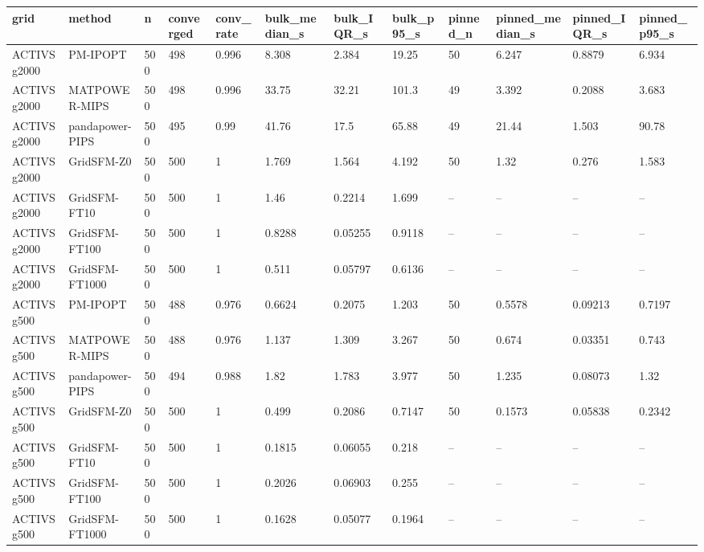 \begin{tabular}{llllllllllll}
\hline
grid & method & n & converged & conv\_rate & bulk\_median\_s & bulk\_IQR\_s & bulk\_p95\_s & pinned\_n & pinned\_median\_s & pinned\_IQR\_s & pinned\_p95\_s \\
\hline
ACTIVSg2000 & PM-IPOPT & 500 & 498 & 0.996 & 8.308 & 2.384 & 19.25 & 50 & 6.247 & 0.8879 & 6.934 \\
ACTIVSg2000 & MATPOWER-MIPS & 500 & 498 & 0.996 & 33.75 & 32.21 & 101.3 & 49 & 3.392 & 0.2088 & 3.683 \\
ACTIVSg2000 & pandapower-PIPS & 500 & 495 & 0.99 & 41.76 & 17.5 & 65.88 & 49 & 21.44 & 1.503 & 90.78 \\
ACTIVSg2000 & GridSFM-Z0 & 500 & 500 & 1 & 1.769 & 1.564 & 4.192 & 50 & 1.32 & 0.276 & 1.583 \\
ACTIVSg2000 & GridSFM-FT10 & 500 & 500 & 1 & 1.46 & 0.2214 & 1.699 & -- & -- & -- & -- \\
ACTIVSg2000 & GridSFM-FT100 & 500 & 500 & 1 & 0.8288 & 0.05255 & 0.9118 & -- & -- & -- & -- \\
ACTIVSg2000 & GridSFM-FT1000 & 500 & 500 & 1 & 0.511 & 0.05797 & 0.6136 & -- & -- & -- & -- \\
ACTIVSg500 & PM-IPOPT & 500 & 488 & 0.976 & 0.6624 & 0.2075 & 1.203 & 50 & 0.5578 & 0.09213 & 0.7197 \\
ACTIVSg500 & MATPOWER-MIPS & 500 & 488 & 0.976 & 1.137 & 1.309 & 3.267 & 50 & 0.674 & 0.03351 & 0.743 \\
ACTIVSg500 & pandapower-PIPS & 500 & 494 & 0.988 & 1.82 & 1.783 & 3.977 & 50 & 1.235 & 0.08073 & 1.32 \\
ACTIVSg500 & GridSFM-Z0 & 500 & 500 & 1 & 0.499 & 0.2086 & 0.7147 & 50 & 0.1573 & 0.05838 & 0.2342 \\
ACTIVSg500 & GridSFM-FT10 & 500 & 500 & 1 & 0.1815 & 0.06055 & 0.218 & -- & -- & -- & -- \\
ACTIVSg500 & GridSFM-FT100 & 500 & 500 & 1 & 0.2026 & 0.06903 & 0.255 & -- & -- & -- & -- \\
ACTIVSg500 & GridSFM-FT1000 & 500 & 500 & 1 & 0.1628 & 0.05077 & 0.1964 & -- & -- & -- & -- \\
\hline
\end{tabular}

